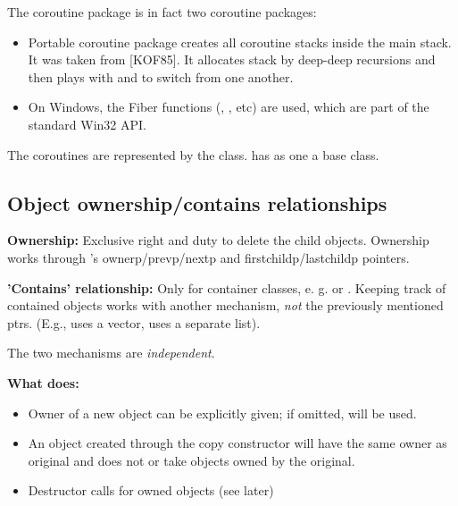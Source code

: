 The coroutine package is in fact two coroutine
packages:

\begin{itemize}
  \item Portable coroutine package creates all coroutine stacks
     inside the main stack. It was taken from [KOF85]. It
     allocates stack by deep-deep recursions and then plays with
      and  to switch from one another.

  \item On Windows, the Fiber functions (,
     , etc) are used, which are part of
     the standard Win32 API.
\end{itemize}

The coroutines are represented by the 
class.  has  as one a
base class.





\subsection{Object ownership/contains relationships}

\textbf{Ownership:} Exclusive right and duty to delete the child
objects.  Ownership works through 's
ownerp/prevp/nextp and firstchildp/lastchildp pointers.


\textbf{'Contains' relationship:} Only
for container classes, e. g.   or .
Keeping track of contained objects works with another mechanism,
\textit{not} the previously mentioned ptrs. (E.g., 
uses a vector,  uses a separate list).

The two mechanisms are \textit{independent}.

\textbf{What  does:}
\begin{itemize}
  \item{Owner of a new object can be explicitly given; if omitted,
     will be used.}
  \item{An object created through the copy
    constructor will have the same
    owner as original and does not  or take objects owned
    by the original.}
  \item{Destructor calls  for owned objects (see later)}
\end{itemize}


